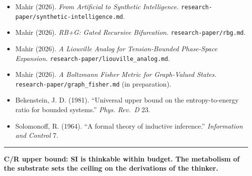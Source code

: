 \documentclass[
  11pt,
  a4paper,
]{article}
\providecommand{\tightlist}{%
  \setlength{\itemsep}{0pt}\setlength{\parskip}{0pt}}
\begin{document}
\begin{itemize}
\tightlist
\item
  Mahir (2026). \emph{From Artificial to Synthetic Intelligence.}
  \texttt{research-paper/synthetic-intelligence.md}.
\item
  Mahir (2026). \emph{RB+G: Gated Recursive Bifurcation.}
  \texttt{research-paper/rbg.md}.
\item
  Mahir (2026). \emph{A Liouville Analog for Tension-Bounded Phase-Space
  Expansion.} \texttt{research-paper/liouville\_analog.md}.
\item
  Mahir (2026). \emph{A Boltzmann Fisher Metric for Graph-Valued
  States.} \texttt{research-paper/graph\_fisher.md} (in preparation).
\item
  Bekenstein, J. D. (1981). ``Universal upper bound on the
  entropy-to-energy ratio for bounded systems.'' \emph{Phys. Rev.~D} 23.
\item
  Solomonoff, R. (1964). ``A formal theory of inductive inference.''
  \emph{Information and Control} 7.
\end{itemize}

\begin{center}\rule{0.5\linewidth}{0.5pt}\end{center}

\textbf{C/R upper bound: SI is thinkable within budget. The metabolism
of the substrate sets the ceiling on the derivations of the thinker.}
\end{document}
